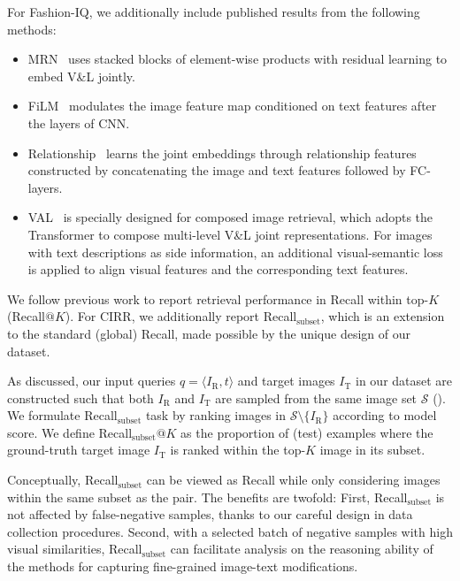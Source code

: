 \documentclass[10pt,twocolumn,letterpaper]{article}
\makeatletter
\renewcommand{\paragraph}{\@startsection{paragraph}{4}{\z@}{1.05ex \@plus 1ex \@minus .2ex}{-1em}{\normalfont\normalsize\bfseries}}
\newcommand{\dstname}{CIRR\xspace}
\makeatother
\begin{document}
For Fashion-IQ, we additionally include published results from the following methods:
\begin{itemize}
  \denselist
  \item MRN~\cite{MRN} uses stacked blocks of element-wise products with residual learning to embed V\&L jointly.
  \item FiLM~\cite{perez2017film} modulates the image feature map conditioned on text features after the layers of CNN.
  \item Relationship~\cite{santoro2017simple} learns the joint embeddings through relationship features constructed by concatenating the image and text features followed by FC-layers.
  \item VAL~\cite{chen2020image_val} is specially designed for composed image retrieval, which adopts the Transformer to compose multi-level V\&L joint representations. For images with text descriptions as side information, an additional visual-semantic loss is applied to align visual features and the corresponding text features.
\end{itemize}

\paragraph{Metric.}\label{sec:extended_metric}
We follow previous work to report retrieval performance in Recall within top-$K$ (Recall$@K$).
For \dstname, we additionally report Recall$_{\text{subset}}$, which is an extension to the standard (global) Recall, made possible by the unique design of our dataset.

As discussed, our input queries $q = \langle I_{\text{R}}, t\rangle$ and target images $I_{\text{T}}$ in our dataset are constructed such that both $I_{\text{R}}$ and $I_{\text{T}}$ are sampled from the same image set $\mathcal{S}$ ().
We formulate Recall$_{\text{subset}}$ task by ranking images in $\mathcal{S} \setminus \{ I_{\text{R}} \}$ according to model score. We define Recall$_{\text{subset}}@K$ as the proportion of (test) examples where the ground-truth target image $I_{\text{T}}$ is ranked within the top-$K$ image in its subset.

Conceptually, Recall$_{\text{subset}}$ can be viewed as Recall while only considering images within the same subset as the pair. 
The benefits are twofold: First, Recall$_{\text{subset}}$ is not affected by false-negative samples, thanks to our careful design in data collection procedures. Second, with a selected batch of negative samples with high visual similarities, Recall$_{\text{subset}}$ can facilitate analysis on the reasoning ability of the methods for capturing fine-grained image-text modifications.
\end{document}
